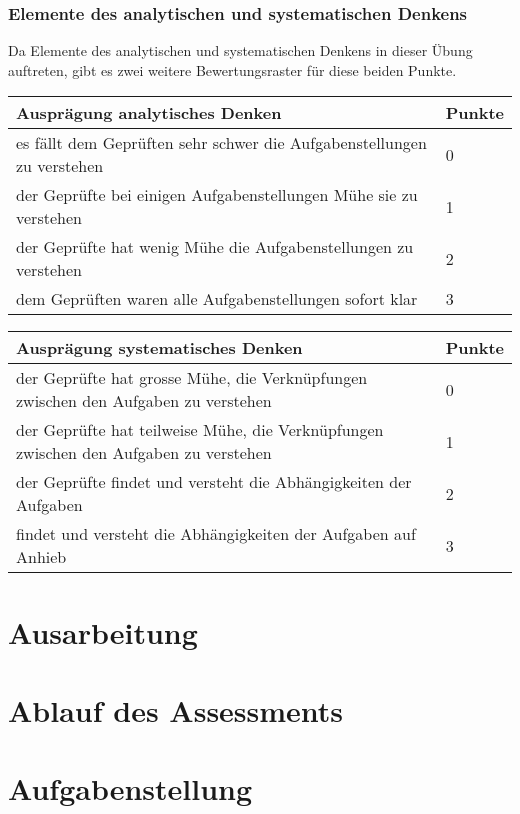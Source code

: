 \subsubsection{Elemente des analytischen und systematischen Denkens}
Da Elemente des analytischen und systematischen Denkens in dieser Übung auftreten, gibt es zwei weitere Bewertungsraster für diese beiden Punkte.

\begin{center}
  \begin{tabular}{ | p{11cm} | p{1cm} |}
   \hline
   \textbf{Ausprägung analytisches Denken} & \textbf{Punkte} \\ \hline
   es fällt dem Geprüften sehr schwer die Aufgabenstellungen zu verstehen & 0 \\ \hline
   der Geprüfte bei einigen Aufgabenstellungen Mühe sie zu verstehen  & 1 \\ \hline
   der Geprüfte hat wenig Mühe die Aufgabenstellungen zu verstehen & 2 \\ \hline
   dem Geprüften waren alle Aufgabenstellungen sofort klar & 3\\ \hline
  \end{tabular}
\end{center}

\begin{center}
  \begin{tabular}{ | p{11cm} | p{1cm} |}
   \hline
   \textbf{Ausprägung systematisches Denken} & \textbf{Punkte} \\ \hline
   der Geprüfte hat grosse Mühe, die Verknüpfungen zwischen den Aufgaben zu verstehen & 0 \\ \hline
    der Geprüfte hat teilweise Mühe, die Verknüpfungen zwischen den Aufgaben zu verstehen & 1 \\ \hline
   der Geprüfte findet und versteht die Abhängigkeiten der Aufgaben & 2 \\ \hline
   findet und versteht die Abhängigkeiten der Aufgaben auf Anhieb & 3\\ \hline
  \end{tabular}
\end{center}

\section{Ausarbeitung}

\section{Ablauf des Assessments}

\section{Aufgabenstellung}